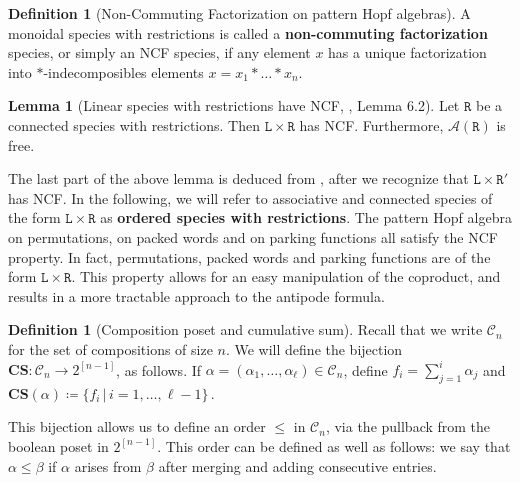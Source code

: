 \documentclass[submission]{FPSAC2023}
\theoremstyle{definition}
\newtheorem{lm}[thm]{Lemma}
\newtheorem{defin}[thm]{Definition}
\newcommand{\III}{\vec{\mathbf{I}}}
\begin{document}
\begin{defin}[Non-Commuting Factorization on pattern Hopf algebras]\label{defin:ncf}
A monoidal species with restrictions is called a \textbf{non-commuting factorization} species, or simply an NCF species, if any element $x$ has a unique factorization into $\ast$-indecomposibles elements $x = x_1 \ast \dots \ast x_n$.
\end{defin}

\begin{lm}[Linear species with restrictions have NCF, \cite{PV2022}, Lemma 6.2]\label{lm:freeness}
Let $\mathtt{R}$ be a connected species with restrictions.
Then $\mathtt{L} \times \mathtt{R}$ has NCF. Furthermore, $\mathcal A(\mathtt{R})$ is free.
\end{lm}

The last part of the above lemma is deduced from \cite{Vargas}, after we recognize that $\mathtt{L} \times \mathtt{R}'$ has NCF. In the following, we will refer to associative and connected species of the form $\mathtt{L} \times \mathtt{R}$ as \textbf{ordered species with restrictions}. The pattern Hopf algebra on permutations, on packed words and on parking functions all satisfy the NCF property.
In fact, permutations, packed words and parking functions are of the form $\mathtt{L} \times \mathtt{R}$.
This property allows for an easy manipulation of the coproduct, and results in a more tractable approach to the antipode formula.

\begin{defin}[Composition poset and cumulative sum]
Recall that we write $\mathcal C_n$ for the set of compositions of size $n$.
We will define the bijection $\mathbf{CS}:\mathcal C_n \to 2^{[n-1]}$, as follows.
If $\alpha =(\alpha_1, \dots, \alpha_{\ell} ) \in \mathcal C_n$, define $f_i = \sum_{j=1}^i \alpha_j$ and $\mathbf{CS}(\alpha) \coloneqq \{f_i\, | \, i = 1, \dots, \ell - 1\} \, $.


This bijection allows us to define an order $\leq $ in $\mathcal C_n$, via the pullback from the boolean poset in $2^{[n-1]}$.
This order can be defined as well as follows: we say that $\alpha \leq \beta$ if $\alpha$ arises from $\beta $ after merging and adding consecutive entries.
\end{defin}

\end{document}
